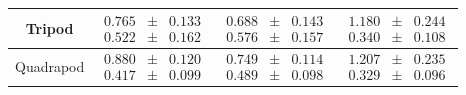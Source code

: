 \documentclass[conference]{IEEEtran}
\begin{document}
\begin{table}[t]
\begin{center}
\begin{tabular}[c]{cccc}
        \midrule
        Tripod & $\begin{matrix}0.765\\0.522\end{matrix} \begin{matrix}\pm\\\pm\end{matrix} \begin{matrix}0.133\\ 0.162\end{matrix}$ & $\begin{matrix}\mathbf{0.688}\\\mathbf{0.576}\end{matrix} \begin{matrix}\pm\\\pm\end{matrix} \begin{matrix}0.143\\ 0.157\end{matrix}$ & $\begin{matrix}1.180\\0.340\end{matrix} \begin{matrix}\pm\\\pm\end{matrix} \begin{matrix}0.244\\0.108\end{matrix}$ \\
        \midrule
        Quadrapod & $\begin{matrix}0.880\\0.417\end{matrix} \begin{matrix}\pm\\\pm\end{matrix} \begin{matrix}0.120\\ 0.099\end{matrix}$ & $\begin{matrix}\mathbf{0.749}\\\mathbf{0.489}\end{matrix} \begin{matrix}\pm\\\pm\end{matrix} \begin{matrix}0.114\\ 0.098\end{matrix}$ & $\begin{matrix}1.207\\0.329\end{matrix} \begin{matrix}\pm\\\pm\end{matrix} \begin{matrix}0.235\\0.096\end{matrix}$ \\

\end{tabular}
\end{center}
\end{table}
\end{document}
